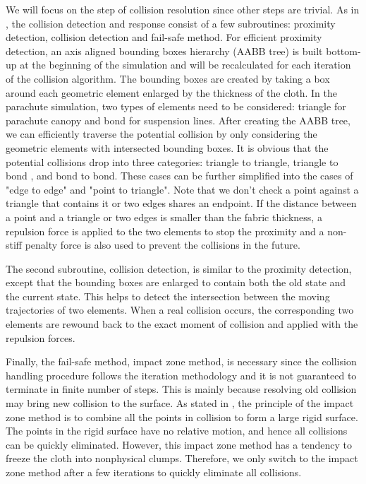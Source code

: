 We will focus on the step of collision resolution since other steps are trivial. As in \cite{BridsonRobust2002}, the collision detection and response consist of a few subroutines: proximity detection, collision detection and fail-safe method. For efficient proximity detection, an axis aligned bounding boxes hierarchy (AABB tree) is built bottom-up at the beginning of the simulation and will be recalculated for each iteration of the collision algorithm. The bounding boxes are created by taking a box around each geometric element enlarged by the thickness of the cloth. In the parachute simulation, two types of elements need to be considered: triangle for parachute canopy and bond for suspension lines. After creating the AABB tree, we can efficiently traverse the potential collision by only considering the geometric elements with intersected bounding boxes. It is obvious that the potential collisions drop into three categories: triangle to triangle, triangle to bond , and bond to bond. These cases can be further simplified into the cases of "edge to edge" and "point to triangle". Note that we don't check a point against a triangle that contains it or two edges shares an endpoint. If the distance between a point and a triangle or two edges is smaller than the fabric thickness, a repulsion force is applied to the two elements to stop the proximity and a non-stiff penalty force is also used to prevent the collisions in the future. 

The second subroutine, collision detection, is similar to the proximity detection, except that the bounding boxes are enlarged to contain both the old state and the current state. This helps to detect the intersection between the moving trajectories of two elements. When a real collision occurs, the corresponding two elements are rewound back to the exact moment of collision and applied with the repulsion forces. 

Finally, the fail-safe method, impact zone method, is necessary since the collision handling procedure follows the iteration methodology and it is not guaranteed to terminate in finite number of steps. This is mainly because resolving old collision may bring new collision to the surface. As stated in \cite{Provot1997}, the principle of the impact zone method is to combine all the points in collision to form a large rigid surface. The points in the rigid surface have no relative motion, and hence all collisions can be quickly eliminated. However, this impact zone method has a tendency to freeze the cloth into nonphysical clumps. Therefore, we only switch to the impact zone method after a few iterations to quickly eliminate all collisions.

